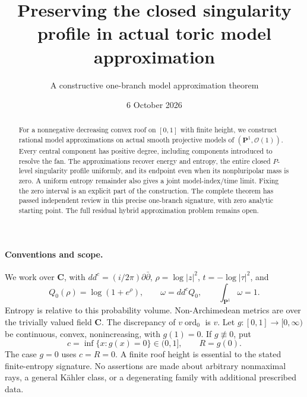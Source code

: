 \documentclass[11pt]{article}
\title{Preserving the closed singularity profile in actual toric model approximation}
\author{A constructive one-branch model approximation theorem}
\date{6 October 2026}
\newcommand{\PP}{\mathbf P}
\begin{document}
\maketitle
\begin{abstract}
For a nonnegative decreasing convex roof on $[0,1]$ with finite height,
we construct rational model approximations on actual smooth projective
models of $(\PP^1,\mathcal O(1))$. Every central component has positive
degree, including components introduced to resolve the fan. The
approximations recover energy and entropy, the entire closed $P$-level
singularity profile uniformly, and its endpoint even when its
nonpluripolar mass is zero. A uniform entropy remainder also gives a
joint model-index/time limit. Fixing the zero interval is an explicit
part of the construction. The complete theorem has passed independent review in this precise
one-branch signature, with zero analytic starting point. The full
residual hybrid approximation problem remains open.
\end{abstract}

\paragraph{Conventions and scope.}
We work over $\mathbf C$, with
$dd^c=(i/2\pi)\partial\bar\partial$,
$\rho=\log|z|^2$, $t=-\log|\tau|^2$, and
\[
 Q_0(\rho)=\log(1+e^\rho),\qquad
 \omega=dd^c Q_0,\qquad \int_{\PP^1}\omega=1.
\]
Entropy is relative to this probability volume. Non-Archimedean
metrics are over the trivially valued field $\mathbf C$.
The discrepancy of $v\operatorname{ord}_0$ is $v$.
Let $g:[0,1]\to[0,\infty)$ be continuous, convex, nonincreasing,
with $g(1)=0$. If $g\not\equiv0$, put
\[
 c=\inf\{x:g(x)=0\}\in(0,1],\qquad R=g(0).
\]
The case $g=0$ uses $c=R=0$. A finite roof height is essential to
the stated finite-entropy signature. No assertions are made about
arbitrary nonmaximal rays, a general K\"ahler class, or a degenerating
family with additional prescribed data.
\end{document}
